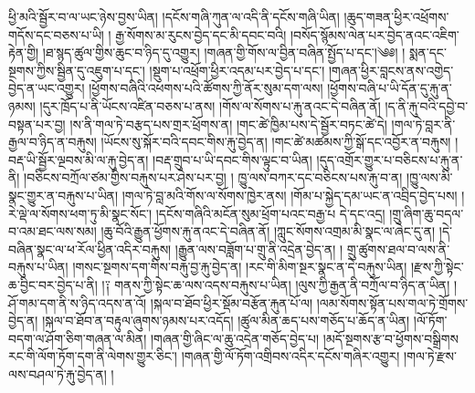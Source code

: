  ཕྱི་མའི་སྦྱོར་བ་ལ་ཡང་ཉེས་བྱས་ཡིན། །དངོས་གཞི་ཀུན་ལ་འདི་ནི་དངོས་གཞི་ཡིན། །ཆུད་གཟན་ཕྱིར་འཕྲོགས་གདོས་དང་བཅས་པ་ཡི། ། རྒྱ་སོགས་མ་རུངས་བྱེད་དང་མི་དབང་བའི། །བསོད་སྙོམས་ལེན་པར་བྱེད་ནའང་འཇིག་རྟེན་གྱི། །ཐ་སྙད་ཚུལ་གྱིས་ཆུང་བ་ཉིད་དུ་འགྱུར། །གཞན་གྱི་གོས་ལ་བྱིན་བཞིན་སྤྱོད་པ་དང་།༄༅། ། སྨན་དང་སྔགས་ཀྱིས་སྦྱིན་དུ་འཇུག་པ་དང་། །སྡུག་པ་འཕྲོག་ཕྱིར་འདམ་པར་བྱེད་པ་དང་། །གཞན་ཕྱིར་བླངས་ནས་འགྱེད་བྱེད་ན་ཡང་འགྱུར། །ཕྱོགས་བཞིའི་འཕགས་པའི་ཚོགས་ཀྱི་ནོར་སུམ་དག་ལས། །ཕྱོགས་བཞི་པ་ཡི་དོན་དུ་རྐུ་ན་ཉམས། །དུར་ཁྲོད་པ་ནི་ཡོངས་འཛིན་བཅས་པ་ནས། །གོས་ལ་སོགས་པ་རྐུ་ནའང་དེ་བཞིན་ནོ། །ད་ནི་རྐུ་བའི་དབྱེ་བ་བསྟན་པར་བྱ། །ས་ནི་གལ་ཏེ་བརྩད་པས་གྲར་ཕྲོགས་ན། །གང་ཚེ་ཁྱིམ་པས་དེ་སྦྱོར་བཏང་ཚེ་དེ། །གལ་ཏེ་བླར་ནི་རྒྱལ་བ་ཉིད་ན་བརྐུས། །ཡོངས་སུ་སྐོར་བའི་དབང་གིས་རྐུ་བྱེད་ན། །གང་ཚེ་མཚམས་ཀྱི་སྒོ་དང་འབྱོར་ན་བརྐུས། །བརྡ་ཡི་སྦྱོར་ལྔབས་མི་ལ་རྐུ་བྱེད་ན། །བརྡ་གྲུབ་པ་ཡི་དབང་གིས་ལྟུང་བ་ཡིན། །དུད་འགྲོར་གྱུར་པ་བཅིངས་པ་རྐུ་ན་ནི། །བཅིངས་བཀྲོལ་ཙམ་གྱིས་བརྐུས་པར་ཤེས་པར་བྱ། ། ཁྱུ་ལས་བཀར་དང་བཅིངས་པས་རྐུ་བ་ན། །ཁྱུ་ལས་མི་སྣང་གྱུར་ན་བརྐུས་པ་ཡིན། །གལ་ཏེ་བླ་མའི་གོས་ལ་སོགས་ཁྱེར་ནས། །གོམ་པ་སྐྱེད་དམ་ཡང་ན་འབྲིད་བྱེད་པས། །རེ་ལྡེ་ལ་སོགས་ཕག་ཏུ་མི་སྣང་སོང་། །དངོས་གཞིའི་མངོན་སུམ་ཕྲོག་པའང་བརྒྱ་པ དེ་དང་འདྲ། །གྲུ་ཞིག་ཆུ་བདལ་བ་འམ་ཐང་ལས་སམ། །ཆུ་བོའི་རྒྱུན་ཕྱོགས་རྐུ་ནའང་དེ་བཞིན་ནོ། །ཀླུང་སོགས་འགྲམ་མི་སྣང་ལ་ཞེང་དུ་ན། །དེ་བཞིན་སྣང་ལ་ཕ་རོལ་ཕྱིན་འདིར་བརྐུས། །རྒྱུན་ལས་བཟློག་པ་གྲུ་ནི་འདྲེན་བྱེད་ན། ། གྲུ་ཚུགས་ཐལ་བ་ལས་ནི་བརྐུས་པ་ཡིན། །གསང་སྔགས་དག་གིས་བརྐུ་བྱ་རྐུ་བྱེད་ན། །རང་གི་མིག་སྔར་སྣང་ན་དེ་བརྐུས་ཡིན། །རྫས་ཀྱི་སྟེང་ཆ་བྱིང་བར་བྱེད་པ་ནི། །༑ གནས་ཀྱི་སྟེང་ཆ་ལས་འདས་བརྐུས་པ་ཡིན། །ལུས་ཀྱི་རྒྱན་ནི་བཀྲོལ་བ་ཉིད་ན་ཡིན། ། ཤོ་གམ་དག་ནི་ས་ཉིད་འདས་ན་འོ། །སྐལ་བ་ཐོབ་ཕྱིར་སྡོམ་བརྩོན་རྐུན་པོ་ལ། །ལམ་སོགས་སྟོན་པས་གལ་ཏེ་གྲོགས་བྱེད་ན། །སྐལ་བ་ཐོབ་ན་བརྟུལ་ཞུགས་ཉམས་པར་འདོད། །ཚུལ་མིན་ཆད་པས་གཅོད་པ་ཆོད་ན་ཡིན། །ལོ་ཏོག་བདག་ལ་ཤོག་ཅིག་གཞན་ལ་མིན། །གཞན་གྱི་ཞིང་ལ་ཆུ་འདྲེན་གཅོད་བྱེད་པ། །མདོ་སྔགས་རྩ་བ་ཕྱོགས་བསྒྲིགས རང་གི་ལོག་ཏོག་དག་ནི་ལེགས་གྱུར་ཅིང་། །གཞན་གྱི་ལོ་ཏོག་འགྲིབས་འདིར་དངོས་གཞིར་འགྱུར། །གལ་ཏེ་རྫས་ལས་བཤལ་ཏེ་རྐུ་བྱེད་ན། །
